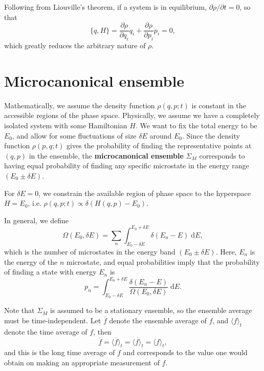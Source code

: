 \documentclass[letter-paper]{tufte-book}
\newenvironment{example}[1][Example]{\begin{trivlist}
\item[\hskip \labelsep {\bfseries #1}]}{\end{trivlist}}
\newcommand\Def[1]{\textbf{#1}}
\begin{document}
Following from Liouville's theorem, if a system is in equilibrium, $\partial
\rho / \partial t = 0$, so that
\begin{equation*}
  \{q, H\} = \frac{\partial \rho}{\partial q_i} \dot{q}_i + \frac{\partial \rho}{\partial p_i} \dot{p}_i = 0,
\end{equation*}
which greatly reduces the arbitrary nature of $\rho$.


\section{Microcanonical ensemble}

Mathematically, we assume the density function $\rho(q,p;t)$ is constant in the
accessible regions of the phase space. Physically, we assume we have a
completely isolated system with some Hamiltonian $H$. We want to fix the total
energy to be $E_0$, and allow for some fluctuations of size $\delta E$ around
$E_0$. Since the density function $\rho(p,q;t)$ gives the probability of finding
the representative points at $(q,p)$ in the ensemble, the \Def{microcanonical
ensemble} $\Sigma_{M}$ corresponds to having equal probability of finding any
specific microstate in the energy range $(E_0 \pm \delta E)$.

\begin{example}
  For $\delta E =0 $, we constrain the available region of phase space to the
  hyperspace $H = E_0$, i.e. $\rho(q,p;t) \propto \delta (H(q,p) - E_0)$.
\end{example}

In general, we define
\begin{equation}
  \Omega(E_0, \delta E) = \sum_n \int^{E_0 + \delta E}_{E_0 - \delta E} \delta(E_n - E)\; \mathrm{d}E,
\end{equation}
which is the number of microstates in the energy band $(E_0 \pm \delta E)$.
Here, $E_n$ is the energy of the $n$ microstate, and equal probabilities imply
that the probability of finding a state with energy $E_n$ is
\begin{equation*}
  p_n = \int^{E_0 + \delta E}_{E_0 - \delta E} \frac{\delta (E_n - E)}{\Omega(E_0, \delta E)}\; \mathrm{d}E.
\end{equation*}

Note that $\Sigma_M$ is assumed to be a stationary ensemble, so the ensemble
average must be time-independent. Let $\overline{f}$ denote the ensemble average
of $f$, and $\langle f\rangle_t$ denote the time average of $f$, then
\begin{equation*}
  \overline{f} = \langle \overline{f}\rangle_t = \overline{\langle f\rangle_t} = \langle f\rangle_t,
\end{equation*}
and this is the long time average of $f$ and corresponds to the value one would
obtain on making an appropriate measurement of $f$.
\end{document}
